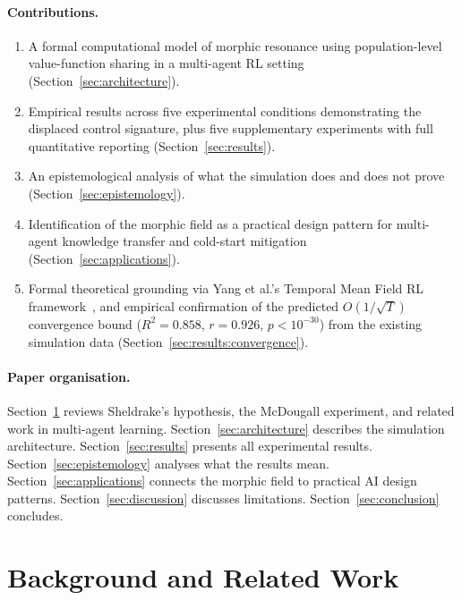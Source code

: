 \documentclass[twoside,11pt]{article}
\begin{document}
\paragraph{Contributions.}
\begin{enumerate}[leftmargin=2em]
    \item A formal computational model of morphic resonance using
          population-level value-function sharing in a multi-agent RL setting
          (Section~\ref{sec:architecture}).
    \item Empirical results across five experimental conditions demonstrating
          the displaced control signature, plus five supplementary experiments
          with full quantitative reporting
          (Section~\ref{sec:results}).
    \item An epistemological analysis of what the simulation does and does
          not prove (Section~\ref{sec:epistemology}).
    \item Identification of the morphic field as a practical design pattern
          for multi-agent knowledge transfer and cold-start mitigation
          (Section~\ref{sec:applications}).
    \item Formal theoretical grounding via Yang et al.'s Temporal Mean Field
          RL framework~\citep{yang2026tmf}, and empirical confirmation of the
          predicted $O(1/\sqrt{T})$ convergence bound ($R^2 = 0.858$,
          $r = 0.926$, $p < 10^{-30}$) from the existing simulation data
          (Section~\ref{sec:results:convergence}).
\end{enumerate}

\paragraph{Paper organisation.}
Section~\ref{sec:background} reviews Sheldrake's hypothesis, the McDougall
experiment, and related work in multi-agent learning.
Section~\ref{sec:architecture} describes the simulation architecture.
Section~\ref{sec:results} presents all experimental results.
Section~\ref{sec:epistemology} analyses what the results mean.
Section~\ref{sec:applications} connects the morphic field to practical AI
design patterns.  Section~\ref{sec:discussion} discusses limitations.
Section~\ref{sec:conclusion} concludes.


\section{Background and Related Work}
\label{sec:background}
\end{document}
